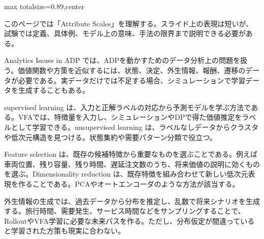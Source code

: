 \begin{minipage}[t]{0.58\textwidth}
\begin{adjustbox}{max totalsize={\textwidth}{0.89\textheight},center}
\begin{minipage}{\textwidth}\scriptsize
{}このページでは「Attribute Scales」を理解する。スライド上の表現は短いが、試験では定義、具体例、モデル上の意味、手法の限界まで説明できる必要がある。\par
Analytics Issues in ADP では、ADPを動かすためのデータ分析上の問題を扱う。価値関数や方策を近似するには、状態、決定、外生情報、報酬、遷移のデータが必要である。実データだけでは不足する場合、シミュレーションで学習データを生成することもある。\par
supervised learning は、入力と正解ラベルの対応から予測モデルを学ぶ方法である。VFAでは、特徴量を入力し、シミュレーションやDPで得た価値推定をラベルとして学習できる。unsupervised learning は、ラベルなしデータからクラスタや低次元構造を見つける。状態集約や需要パターン分類で役立つ。\par
Feature selection は、既存の候補特徴から重要なものを選ぶことである。例えば車両位置、残り容量、残り時間、遅延注文数のうち、将来価値の説明に効くものを選ぶ。Dimensionality reduction は、既存特徴を組み合わせて新しい低次元表現を作ることである。PCAやオートエンコーダのような方法が該当する。\par
外生情報の生成では、過去データから分布を推定し、乱数で将来シナリオを生成する。旅行時間、需要発生、サービス時間などをサンプリングすることで、RolloutやVFA学習に必要な未来パスを作る。ただし、分布仮定が間違っていると学習された方策も現実に合わない。\par

\end{minipage}
\end{adjustbox}
\end{minipage}
